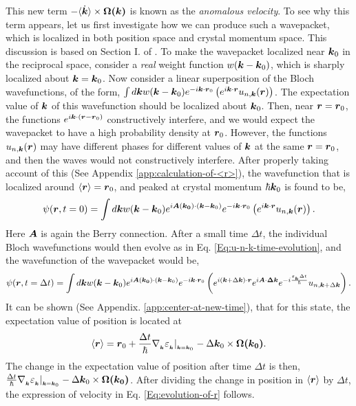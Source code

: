 \documentclass{report}
\renewcommand\vec[1]{\ensuremath\boldsymbol{#1}} %
\begin{document}
This new term $- \langle\dot{\vec{k}}\rangle \times \vec{\Omega(\vec{k})}$ is known as the \textit{anomalous velocity}. To see why this term appears, let us first investigate how we can produce such a wavepacket, which is localized in both position space and crystal momentum space. This discussion is based on Section I. of \cite{ralph2020berry}. To make the wavepacket localized near $\vec{k}_0$ in the reciprocal space, consider a \textit{real} weight function $w(\vec{k} - \vec{k}_0)$, which is sharply localized about $\vec{k} = \vec{k}_0$. Now consider a linear superposition of the Bloch wavefunctions, of the form, $\int d\vec{k} w(\vec{k} - \vec{k}_0) e^{-i \vec{k} \cdot \vec{r}_0 } \left(e^{i \vec{k} \cdot\vec{r}} u_{n,\vec{k}}(\vec{r})\right)$. The expectation value of $\vec{k}$ of this wavefunction should be localized about $\vec{k}_0$. Then, near $\vec{r} = \vec{r}_0$, the functions $e^{i \vec{k} \cdot (\vec{r} -\vec{r}_0 )}$ constructively interfere, and we would expect the wavepacket to have a high probability density at $\vec{r}_0$. However, the functions $u_{n,\vec{k}}(\vec{r})$ may have different phases for different values of $\vec{k}$ at the same $\vec{r} = \vec{r}_0$, and then the waves would not constructively interfere.
After properly taking account of this (See Appendix \ref{app:calculation-of-<r>}), the wavefunction that is localized around $\expval{\vec{r}} = \vec{r}_0$, and peaked at crystal momentum $\hbar \vec{k}_0$ is found to be,
\begin{equation}\label{Eq:wavefunction-wavepacket}
	\psi(\vec{r}, t=0) = \int d\vec{k} w(\vec{k} - \vec{k}_0) e^{i \vec{A}(\vec{k_0})\cdot (\vec{k} - \vec{k}_0)} e^{-i \vec{k} \cdot \vec{r}_0 } \left(e^{i \vec{k} \cdot\vec{r}} u_{n,\vec{k}}(\vec{r})\right).
\end{equation}
Here $\vec{A}$ is again the Berry connection. After a small time $\Delta t$, the individual Bloch wavefunctions would then evolve as in Eq. \eqref{Eq:u-n-k-time-evolution}, and the wavefunction of the wavepacket would be,
$$\psi(\vec{r}, t=\Delta t) = \int d\vec{k} w(\vec{k} - \vec{k}_0) e^{i \vec{A}(\vec{k_0})\cdot (\vec{k} - \vec{k}_0)} e^{-i \vec{k} \cdot \vec{r}_0 } \left(e^{i (\vec{k} + \Delta\vec{k})\cdot\vec{r}} e^{i \vec{A}\cdot \vec{\Delta{k}}} e^{-i \frac{\varepsilon_{_{\vec{k}}} \Delta t}{\hbar}} u_{n, \vec{k}+\Delta \vec{k}} \right).$$
It can be shown (See Appendix. \ref{app:center-at-new-time}), that for this state, the expectation value of position is located at
$$\langle \vec{r} \rangle = \vec{r}_0 +  \frac{\Delta t}{\hbar} \nabla{_{_{\vec{k}}}} \varepsilon_{_{\vec{k}}}|_{_{\vec{k} = \vec{k}_0}} - \Delta \vec{k}_0 \times \vec{\Omega(\vec{k}_0)}.$$
The change in the expectation value of position after time $\Delta t$ is then, $\frac{\Delta t}{\hbar} \nabla{_{_{\vec{k}}}} \varepsilon_{_{\vec{k}}}|_{_{\vec{k} = \vec{k}_0}} - \Delta \vec{k}_0 \times \vec{\Omega(\vec{k}_0)}$. After dividing the change in position in $\langle{\vec{r}}\rangle$ by $\Delta t$, the expression of velocity in Eq. \eqref{Eq:evolution-of-r} follows.
\end{document}

